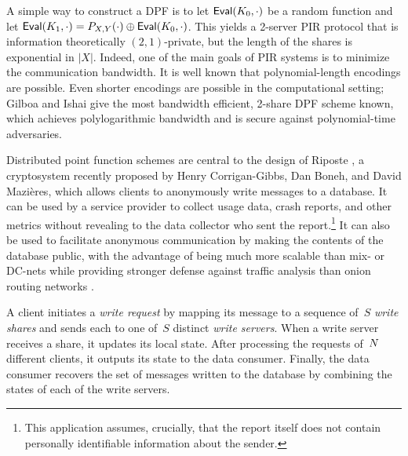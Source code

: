 A simple way to construct a DPF is to let $\mathsf{Eval}(K_0, \cdot)$ be a random
function and let $\mathsf{Eval}(K_1, \cdot) = P_{X,Y}(\cdot) \mathbin{\oplus} \mathsf{Eval}(K_0, \cdot)$.
%
This yields a 2-server PIR protocol that is information theoretically
$(2,1)$-private, but the length of the shares is exponential in $|X|$. Indeed,
one of the main goals of PIR systems is to minimize the communication bandwidth.
%
It is well known that polynomial-length encodings are possible. Even shorter
encodings are possible in the computational setting; Gilboa and Ishai \cite{dpf}
give the most bandwidth efficient, 2-share DPF scheme known, which achieves
polylogarithmic bandwidth and is secure against polynomial-time adversaries.

Distributed point function schemes are central to the design of Riposte
\cite{riposte}, a cryptosystem recently proposed by Henry Corrigan-Gibbs, Dan
Boneh, and David Mazi\`{e}res,
which allows clients to anonymously write messages to a database. It can be used
by a service provider to collect usage data, crash reports, and other metrics
without revealing to the data collector who sent the report.\footnote{ This
application assumes, crucially, that the report itself does not contain
personally identifiable information about the sender.} It can also be used to
facilitate anonymous communication by making the contents of the database
public, with the advantage of being much more scalable than mix- or DC-nets
\cite{mix-nets,dc-nets} while providing stronger defense against traffic analysis
than onion routing networks \cite{tor}.

A client initiates a \emph{write request} by mapping its message to a sequence
of~$S$ \emph{write shares} and sends each to one of~$S$ distinct
\emph{write servers}. When a write server receives a share, it updates its local
state.  After processing the requests of~$N$ different clients, it
outputs its state to the data consumer. Finally, the data consumer recovers the
set of messages written to the database by combining the states of each of the
write servers.

